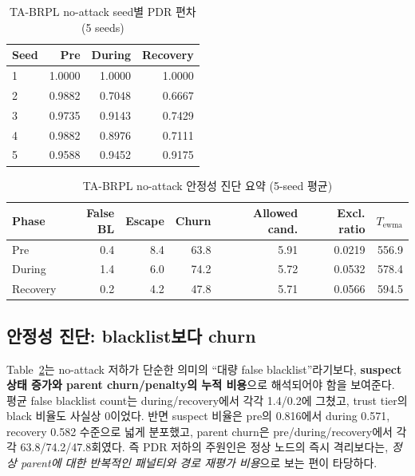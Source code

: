 \documentclass[12pt,a4paper]{article}
\begin{document}
\begin{table}[t]
  \centering
  \caption{TA-BRPL no-attack seed별 PDR 편차 (5 seeds)}
  \label{tab:noattack-seeds}
  \begin{tabular}{lrrr}
    \toprule
    Seed & Pre & During & Recovery \\
    \midrule
    1 & 1.0000 & 1.0000 & 1.0000 \\
    2 & 0.9882 & 0.7048 & 0.6667 \\
    3 & 0.9735 & 0.9143 & 0.7429 \\
    4 & 0.9882 & 0.8976 & 0.7111 \\
    5 & 0.9588 & 0.9452 & 0.9175 \\
    \bottomrule
  \end{tabular}
\end{table}

\begin{table}[t]
  \centering
  \caption{TA-BRPL no-attack 안정성 진단 요약 (5-seed 평균)}
  \label{tab:noattack-diagnostics}
  \begin{tabular}{lrrrrrr}
    \toprule
    Phase & False BL & Escape & Churn & Allowed cand. & Excl. ratio & $T_\text{ewma}$ \\
    \midrule
    Pre      & 0.4 & 8.4 & 63.8 & 5.91 & 0.0219 & 556.9 \\
    During   & 1.4 & 6.0 & 74.2 & 5.72 & 0.0532 & 578.4 \\
    Recovery & 0.2 & 4.2 & 47.8 & 5.71 & 0.0566 & 594.5 \\
    \bottomrule
  \end{tabular}
\end{table}

\subsection{안정성 진단: blacklist보다 churn}

Table~\ref{tab:noattack-diagnostics}는 no-attack 저하가 단순한 의미의
``대량 false blacklist''라기보다, \textbf{suspect 상태 증가와 parent churn/penalty의 누적 비용}으로
해석되어야 함을 보여준다. 평균 false blacklist count는 during/recovery에서 각각 1.4/0.2에 그쳤고,
trust tier의 black 비율도 사실상 0이었다. 반면 suspect 비율은 pre의 0.816에서 during 0.571,
recovery 0.582 수준으로 넓게 분포했고, parent churn은 pre/during/recovery에서 각각 63.8/74.2/47.8회였다.
즉 PDR 저하의 주원인은 정상 노드의 즉시 격리보다는,
\emph{정상 parent에 대한 반복적인 패널티와 경로 재평가 비용}으로 보는 편이 타당하다.
\end{document}
